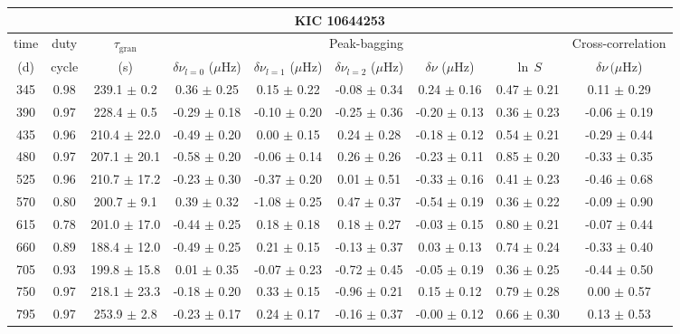 \documentclass[twocolumn]{aastex61}%
\begin{document}
\begin{table}[ht]\centering\fontsize{9.}{7.}\selectfont
\begin{tabular}{ccc|ccccc|c}
\multicolumn{9}{c}{KIC 10644253}\\ \hline\hline
time & duty & $\tau_\text{gran}$ &\multicolumn{5}{c|}{Peak-bagging}&Cross-correlation\\
(d)& cycle & (s)&$\delta\nu_{l=0}$ ($\mu$Hz) & $\delta\nu_{l=1}$ ($\mu$Hz) & $\delta\nu_{l=2}$ ($\mu$Hz) & $\delta\nu$ ($\mu$Hz)& $\ln\,S$ & $\delta\nu\,(\mu$Hz)\\\hline
345 & 0.98 & 239.1 $\pm$ 0.2 & 0.36 $\pm$ 0.25 & 0.15 $\pm$ 0.22 & -0.08 $\pm$ 0.34 & 0.24 $\pm$ 0.16 & 0.47 $\pm$ 0.21 & 0.11 $\pm$ 0.29\\
390 & 0.97 & 228.4 $\pm$ 0.5 & -0.29 $\pm$ 0.18 & -0.10 $\pm$ 0.20 & -0.25 $\pm$ 0.36 & -0.20 $\pm$ 0.13 & 0.36 $\pm$ 0.23 & -0.06 $\pm$ 0.19\\
435 & 0.96 & 210.4 $\pm$ 22.0 & -0.49 $\pm$ 0.20 & 0.00 $\pm$ 0.15 & 0.24 $\pm$ 0.28 & -0.18 $\pm$ 0.12 & 0.54 $\pm$ 0.21 & -0.29 $\pm$ 0.44\\
480 & 0.97 & 207.1 $\pm$ 20.1 & -0.58 $\pm$ 0.20 & -0.06 $\pm$ 0.14 & 0.26 $\pm$ 0.26 & -0.23 $\pm$ 0.11 & 0.85 $\pm$ 0.20 & -0.33 $\pm$ 0.35\\
525 & 0.96 & 210.7 $\pm$ 17.2 & -0.23 $\pm$ 0.30 & -0.37 $\pm$ 0.20 & 0.01 $\pm$ 0.51 & -0.33 $\pm$ 0.16 & 0.41 $\pm$ 0.23 & -0.46 $\pm$ 0.68\\
570 & 0.80 & 200.7 $\pm$ 9.1 & 0.39 $\pm$ 0.32 & -1.08 $\pm$ 0.25 & 0.47 $\pm$ 0.37 & -0.54 $\pm$ 0.19 & 0.36 $\pm$ 0.22 & -0.09 $\pm$ 0.90\\
615 & 0.78 & 201.0 $\pm$ 17.0 & -0.44 $\pm$ 0.25 & 0.18 $\pm$ 0.18 & 0.18 $\pm$ 0.27 & -0.03 $\pm$ 0.15 & 0.80 $\pm$ 0.21 & -0.07 $\pm$ 0.44\\
660 & 0.89 & 188.4 $\pm$ 12.0 & -0.49 $\pm$ 0.25 & 0.21 $\pm$ 0.15 & -0.13 $\pm$ 0.37 & 0.03 $\pm$ 0.13 & 0.74 $\pm$ 0.24 & -0.33 $\pm$ 0.40\\
705 & 0.93 & 199.8 $\pm$ 15.8 & 0.01 $\pm$ 0.35 & -0.07 $\pm$ 0.23 & -0.72 $\pm$ 0.45 & -0.05 $\pm$ 0.19 & 0.36 $\pm$ 0.25 & -0.44 $\pm$ 0.50\\
750 & 0.97 & 218.1 $\pm$ 23.3 & -0.18 $\pm$ 0.20 & 0.33 $\pm$ 0.15 & -0.96 $\pm$ 0.21 & 0.15 $\pm$ 0.12 & 0.79 $\pm$ 0.28 & 0.00 $\pm$ 0.57\\
795 & 0.97 & 253.9 $\pm$ 2.8 & -0.23 $\pm$ 0.17 & 0.24 $\pm$ 0.17 & -0.16 $\pm$ 0.37 & -0.00 $\pm$ 0.12 & 0.66 $\pm$ 0.30 & 0.13 $\pm$ 0.53\\

\end{tabular}
\end{table}
\end{document}
